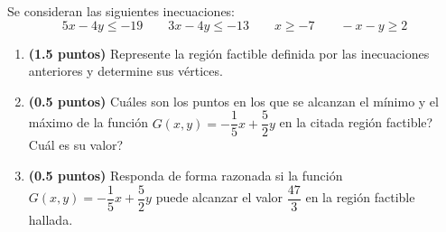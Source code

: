 
Se consideran las siguientes inecuaciones:
\[
5x-4y\leq -19\qquad 3x-4y\leq -13\qquad x\geq -7\qquad -x-y\geq 2
\]
\begin{enumerate}[label=\alph*)]
  \item \textbf{(1.5 puntos)} Represente la región factible definida por las
  inecuaciones anteriores y determine sus vértices.
  \item \textbf{(0.5 puntos)} \textquestiondown{}Cuáles son los puntos en los
  que se alcanzan el mínimo y el máximo de la función
  $G(x,y)=-\dfrac{1}{5}x+\dfrac{5}{2}y$ en la citada región factible?
  \textquestiondown{}Cuál es su valor?
  \item \textbf{(0.5 puntos)} Responda de forma razonada si la función
  $G(x,y)=-\dfrac{1}{5}x+\dfrac{5}{2}y$ puede alcanzar el valor $\dfrac{47}{3}$
  en la región factible hallada.
\end{enumerate}

